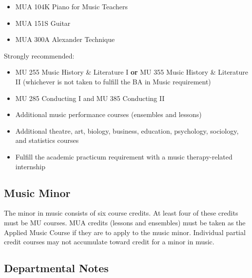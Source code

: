 \documentclass[
  letterpaper,
]{scrbook}
\providecommand{\tightlist}{%
  \setlength{\itemsep}{0pt}\setlength{\parskip}{0pt}}
\begin{document}
\begin{enumerate}
\begin{itemize}
    \begin{itemize}
    \tightlist
    \item
      MUA 104K Piano for Music Teachers
    \item
      MUA 151S Guitar
    \item
      MUA 300A Alexander Technique
    \end{itemize}
  \end{itemize}
\end{enumerate}

Strongly recommended:

\begin{itemize}
\tightlist
\item
  MU 255 Music History \& Literature I \textbf{or} MU 355 Music History
  \& Literature II (whichever is not taken to fulfill the BA in Music
  requirement)
\item
  MU 285 Conducting I and MU 385 Conducting II
\item
  Additional music performance courses (ensembles and lessons)
\item
  Additional theatre, art, biology, business, education, psychology,
  sociology, and statistics courses
\item
  Fulfill the academic practicum requirement with a music
  therapy-related internship
\end{itemize}

\subsection{Music Minor}\label{music-minor}

The minor in music consists of six course credits. At least four of
these credits must be MU courses. MUA credits (lessons and ensembles)
must be taken as the Applied Music Course if they are to apply to the
music minor. Individual partial credit courses may not accumulate toward
credit for a minor in music.

\subsection{Departmental Notes}\label{departmental-notes}
\end{document}
